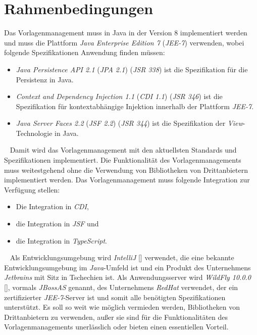 \section{Rahmenbedingungen}
Das Vorlagenmanagement muss in Java in der Version 8 implementiert werden und muss die Plattform \emph{Java Enterprise Edition 7} (\emph{JEE-7}) verwenden, wobei folgende Spezifikationen Anwendung finden müssen:
\begin{itemize}
	\item \emph{Java Persistence API 2.1} (\emph{JPA 2.1}) (\emph{JSR 338}) ist die Spezifikation für die Persistenz in Java.
	\item \emph{Context and Dependency Injection 1.1} (\emph{CDI 1.1}) (\emph{JSR 346}) ist die Spezifikation für kontextabhängige Injektion innerhalb der Plattform \emph{JEE-7}.
	\item \emph{Java Server Faces 2.2} (\emph{JSF 2.2}) (\emph{JSR 344}) ist die Spezifikation der \emph{View}-Technologie in Java. 
\end{itemize}
\ \newline
Damit wird das Vorlagenmanagement mit den aktuellsten Standards und Spezifikationen implementiert. Die Funktionalität des Vorlagenmanagements muss weitestgehend ohne die Verwendung von Bibliotheken von Drittanbietern implementiert werden. Das Vorlagenmanagement muss folgende Integration zur Verfügung stellen:
\begin{itemize}
	\item Die Integration in \emph{CDI},
	\item die Integration in \emph{JSF} und
	\item die Integration in \emph{TypeScript}.
\end{itemize} 
\ \newline
Als Entwicklungsumgebung wird \emph{IntelliJ} [\cite{intelliJ}] verwendet, die eine bekannte Entwicklungsumgebung im \emph{Java}-Umfeld ist und ein Produkt des Unternehmens \emph{Jetbrains} mit Sitz in Tschechien ist. 
\newline
\newline
Als Anwendungsserver wird \emph{WildFly 10.0.0} [\cite{wildFly}], vormals \emph{JBossAS} genannt, des Unternehmens \emph{RedHat} verwendet, der ein zertifizierter \emph{JEE-7}-Server ist und somit alle benötigten Spezifikationen unterstützt. 
\newline
\newline
Es soll so weit wie möglich vermieden werden, Bibliotheken von Drittanbietern zu verwenden, außer sie sind für die Funktionalitäten des Vorlagenmanagements unerlässlich oder bieten einen essentiellen Vorteil.
